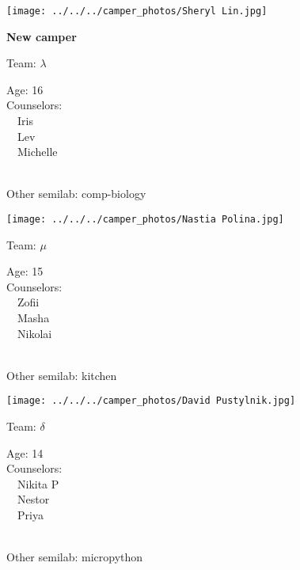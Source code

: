 \documentclass[10pt,letterpaper, landscape]{article}
\begin{document}
\horizontalshiftfornextsticker
\renewcommand{\baselinestretch}{1} \begin{sticker}
\noindent\begin{minipage}{0.5\textwidth}\texttt{[image: ../../../camper\_photos/Sheryl Lin.jpg]}\end{minipage}\begin{minipage}{0.45\textwidth}
\textbf{New camper} 

Team: {\Large $\lambda$}

Age:        16\\
Counselors: \\\ \ Iris\\\ \ Lev\\\ \ Michelle\\
\end{minipage} \\ \vspace{0.07in}
Other semilab: comp-biology
\end{sticker}
\verticalshiftfornextsticker
\renewcommand{\baselinestretch}{1} \begin{sticker}
\noindent\begin{minipage}{0.5\textwidth}\texttt{[image: ../../../camper\_photos/Nastia Polina.jpg]}\end{minipage}\begin{minipage}{0.45\textwidth}
Team: {\Large $\mu$}

Age:        15\\
Counselors: \\\ \ Zofii\\\ \ Masha\\\ \ Nikolai\\
\end{minipage} \\ \vspace{0.07in}
Other semilab: kitchen
\end{sticker}
\horizontalshiftfornextsticker
\renewcommand{\baselinestretch}{1} \begin{sticker}
\noindent\begin{minipage}{0.5\textwidth}\texttt{[image: ../../../camper\_photos/David Pustylnik.jpg]}\end{minipage}\begin{minipage}{0.45\textwidth}
Team: {\Large $\delta$}

Age:        14\\
Counselors: \\\ \ Nikita P\\\ \ Nestor\\\ \ Priya\\
\end{minipage} \\ \vspace{0.07in}
Other semilab: micropython
\end{sticker}
\end{document}
